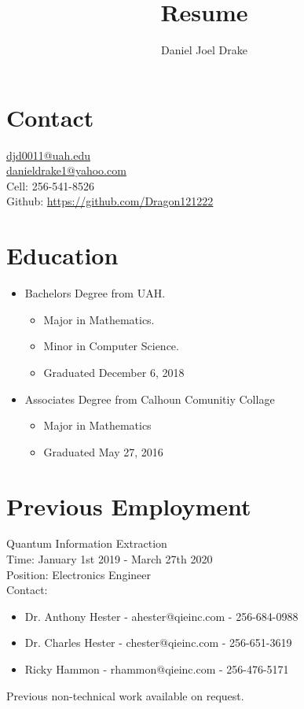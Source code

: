 \documentclass[10pt]{extarticle}
\title{
	Resume \\
}
\author{Daniel Joel Drake}
\theoremstyle{plain}
\theoremstyle{Definition}
\theoremstyle{Definition}
\theoremstyle{plain}
\begin{document}
	\twocolumn
	\maketitle		
	\noindent
	\section{Contact}
	\href{mailto:djd0011@uah.edu}{djd0011@uah.edu}  \\
	\href{mailto:danieldrake1@yahoo.com}{danieldrake1@yahoo.com}  \\
	Cell: 256-541-8526  \\
	Github: \href{https://github.com/Dragon121222}{https://github.com/Dragon121222} 
	\section{Education}
		\begin{itemize}
			\item Bachelors Degree from UAH.
			\begin{itemize}
				\item Major in Mathematics.
				\item Minor in Computer Science.
				\item Graduated December 6, 2018
		\end{itemize}
			\item Associates Degree from Calhoun Comunitiy Collage
			\begin{itemize}
				\item Major in Mathematics
				\item Graduated May 27, 2016
			\end{itemize}
		\end{itemize}
	\section{Previous Employment}
		Quantum Information Extraction \\
		Time: January 1st 2019 - March 27th 2020 \\ 
		Position: Electronics Engineer \\	 
		Contact: 
		\begin{itemize}
			\item Dr. Anthony Hester - ahester@qieinc.com - 256-684-0988
			\item Dr. Charles Hester - chester@qieinc.com - 256-651-3619
			\item Ricky Hammon - rhammon@qieinc.com - 256-476-5171
		\end{itemize}	
	Previous non-technical work available on request. 
\end{document}
